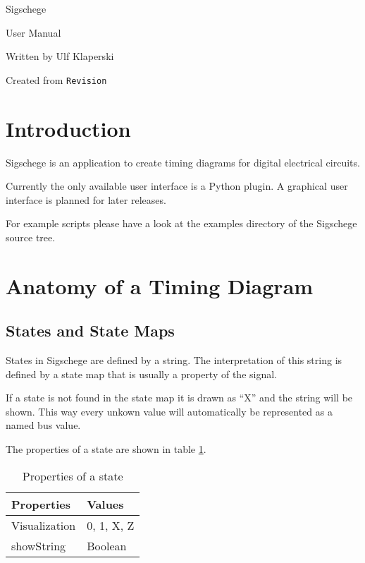\documentclass[11pt]{article}
\begin{document}
\begin{center}
\Huge Sigschege

\vspace{1cm}

\LARGE User Manual

\vspace{3cm}

Written by Ulf Klaperski

\vspace{1cm}

Created from \verb$Revision$
  
\end{center}

\eject

\section{Introduction}
\label{sec:intro}

Sigschege is an application to create timing diagrams for digital electrical circuits.

Currently the only available user interface is a Python plugin. A graphical user
interface is planned for later releases.

For example scripts please have a look at the examples directory of the
Sigschege source tree.

\section{Anatomy of a Timing Diagram}
\label{sec:anatomy}

\subsection{States and State Maps}
\label{subsec:statemap}

States in Sigschege are defined by a string. The interpretation of this string
is defined by a state map that is usually a property of the signal.  

If a state is not found in the state map it is drawn as ``X'' and the string
will be shown. This way every unkown value will automatically be represented as
a named bus value.

The properties of a state are shown in table \ref{tab:statemap}.

\begin{table}[htbp]
  \centering
  \begin{tabular}[l]{l|l}
    \textbf{Properties}&\textbf{Values}\\\hline
    Visualization&0, 1, X, Z\\
    showString&Boolean\\\hline
  \end{tabular}
  \caption{Properties of a state}
  \label{tab:statemap}
\end{table}
\end{document}
